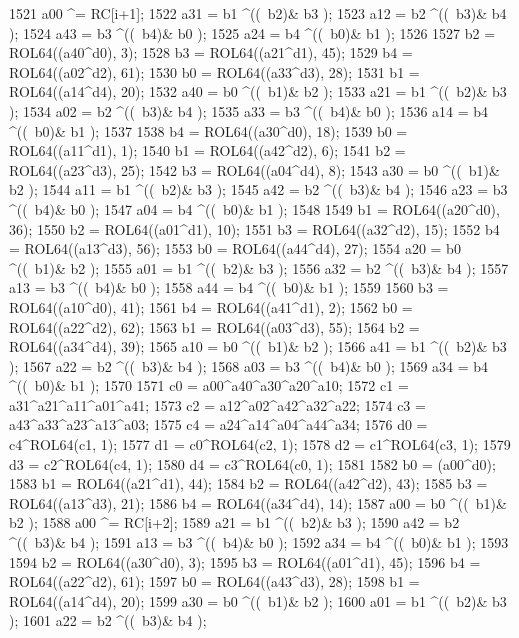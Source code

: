 \begin{DoxyCode}
1521     a00 ^= RC[i+1];
1522     a31 =   b1 ^((~b2)&  b3 );
1523     a12 =   b2 ^((~b3)&  b4 );
1524     a43 =   b3 ^((~b4)&  b0 );
1525     a24 =   b4 ^((~b0)&  b1 );
1526 
1527     b2 = ROL64((a40^d0), 3);
1528     b3 = ROL64((a21^d1), 45);
1529     b4 = ROL64((a02^d2), 61);
1530     b0 = ROL64((a33^d3), 28);
1531     b1 = ROL64((a14^d4), 20);
1532     a40 =   b0 ^((~b1)&  b2 );
1533     a21 =   b1 ^((~b2)&  b3 );
1534     a02 =   b2 ^((~b3)&  b4 );
1535     a33 =   b3 ^((~b4)&  b0 );
1536     a14 =   b4 ^((~b0)&  b1 );
1537 
1538     b4 = ROL64((a30^d0), 18);
1539     b0 = ROL64((a11^d1), 1);
1540     b1 = ROL64((a42^d2), 6);
1541     b2 = ROL64((a23^d3), 25);
1542     b3 = ROL64((a04^d4), 8);
1543     a30 =   b0 ^((~b1)&  b2 );
1544     a11 =   b1 ^((~b2)&  b3 );
1545     a42 =   b2 ^((~b3)&  b4 );
1546     a23 =   b3 ^((~b4)&  b0 );
1547     a04 =   b4 ^((~b0)&  b1 );
1548 
1549     b1 = ROL64((a20^d0), 36);
1550     b2 = ROL64((a01^d1), 10);
1551     b3 = ROL64((a32^d2), 15);
1552     b4 = ROL64((a13^d3), 56);
1553     b0 = ROL64((a44^d4), 27);
1554     a20 =   b0 ^((~b1)&  b2 );
1555     a01 =   b1 ^((~b2)&  b3 );
1556     a32 =   b2 ^((~b3)&  b4 );
1557     a13 =   b3 ^((~b4)&  b0 );
1558     a44 =   b4 ^((~b0)&  b1 );
1559 
1560     b3 = ROL64((a10^d0), 41);
1561     b4 = ROL64((a41^d1), 2);
1562     b0 = ROL64((a22^d2), 62);
1563     b1 = ROL64((a03^d3), 55);
1564     b2 = ROL64((a34^d4), 39);
1565     a10 =   b0 ^((~b1)&  b2 );
1566     a41 =   b1 ^((~b2)&  b3 );
1567     a22 =   b2 ^((~b3)&  b4 );
1568     a03 =   b3 ^((~b4)&  b0 );
1569     a34 =   b4 ^((~b0)&  b1 );
1570 
1571     c0 = a00^a40^a30^a20^a10;
1572     c1 = a31^a21^a11^a01^a41;
1573     c2 = a12^a02^a42^a32^a22;
1574     c3 = a43^a33^a23^a13^a03;
1575     c4 = a24^a14^a04^a44^a34;
1576     d0 = c4^ROL64(c1, 1);
1577     d1 = c0^ROL64(c2, 1);
1578     d2 = c1^ROL64(c3, 1);
1579     d3 = c2^ROL64(c4, 1);
1580     d4 = c3^ROL64(c0, 1);
1581 
1582     b0 = (a00^d0);
1583     b1 = ROL64((a21^d1), 44);
1584     b2 = ROL64((a42^d2), 43);
1585     b3 = ROL64((a13^d3), 21);
1586     b4 = ROL64((a34^d4), 14);
1587     a00 =   b0 ^((~b1)&  b2 );
1588     a00 ^= RC[i+2];
1589     a21 =   b1 ^((~b2)&  b3 );
1590     a42 =   b2 ^((~b3)&  b4 );
1591     a13 =   b3 ^((~b4)&  b0 );
1592     a34 =   b4 ^((~b0)&  b1 );
1593 
1594     b2 = ROL64((a30^d0), 3);
1595     b3 = ROL64((a01^d1), 45);
1596     b4 = ROL64((a22^d2), 61);
1597     b0 = ROL64((a43^d3), 28);
1598     b1 = ROL64((a14^d4), 20);
1599     a30 =   b0 ^((~b1)&  b2 );
1600     a01 =   b1 ^((~b2)&  b3 );
1601     a22 =   b2 ^((~b3)&  b4 );

\end{DoxyCode}
